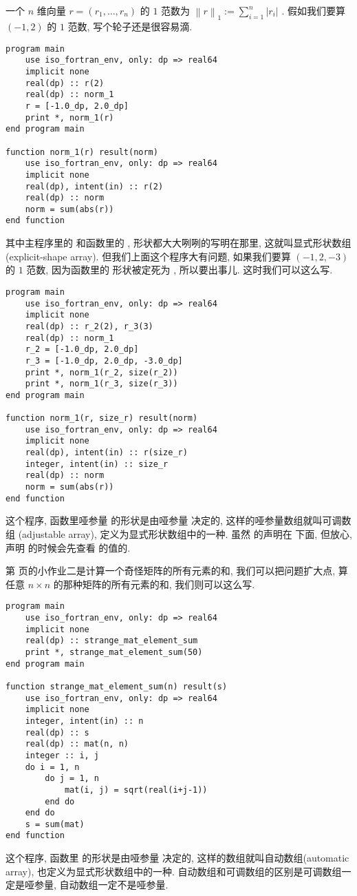一个 $ n $ 维向量 $ r=(r_1, \dots, r_n) $ 的 $ 1 $ 范数为 $ \left\lVert r\right\rVert_1:=\sum_{i=1} ^n\left\lvert r_i\right\rvert  $ . 假如我们要算 $(-1, 2) $ 的 $ 1 $ 范数, 写个轮子还是很容易滴. 
\begin{lstlisting} 
program main
    use iso_fortran_env, only: dp => real64
    implicit none
    real(dp) :: r(2)
    real(dp) :: norm_1
    r = [-1.0_dp, 2.0_dp]
    print *, norm_1(r)
end program main

function norm_1(r) result(norm)
    use iso_fortran_env, only: dp => real64
    implicit none
    real(dp), intent(in) :: r(2)
    real(dp) :: norm
    norm = sum(abs(r))
end function
\end{lstlisting} 
其中主程序里的  和函数里的 , 形状都大大咧咧的写明在那里, 这就叫显式形状数组 (explicit-shape array). 但我们上面这个程序大有问题, 如果我们要算 $(-1, 2, -3) $ 的 $ 1 $ 范数, 因为函数里的  形状被定死为 \ttt{[2]}, 所以要出事儿. 这时我们可以这么写. \label{adjustable_array} 
\begin{lstlisting} 
program main
    use iso_fortran_env, only: dp => real64
    implicit none
    real(dp) :: r_2(2), r_3(3)
    real(dp) :: norm_1
    r_2 = [-1.0_dp, 2.0_dp]
    r_3 = [-1.0_dp, 2.0_dp, -3.0_dp]
    print *, norm_1(r_2, size(r_2))
    print *, norm_1(r_3, size(r_3))
end program main

function norm_1(r, size_r) result(norm)
    use iso_fortran_env, only: dp => real64
    implicit none
    real(dp), intent(in) :: r(size_r)
    integer, intent(in) :: size_r
    real(dp) :: norm
    norm = sum(abs(r))
end function
\end{lstlisting} 
这个程序, 函数里哑参量  的形状是由哑参量  决定的, 这样的哑参量数组就叫可调数组 (adjustable array), 定义为显式形状数组中的一种. 虽然  的声明在  下面, 但放心, 声明  的时候会先查看  的值的. 

第 \pageref{hw_2} 页的小作业二是计算一个奇怪矩阵的所有元素的和, 我们可以把问题扩大点, 算任意 $ n\times n $ 的那种矩阵的所有元素的和, 我们则可以这么写. 
\begin{lstlisting} 
program main
    use iso_fortran_env, only: dp => real64
    implicit none
    real(dp) :: strange_mat_element_sum
    print *, strange_mat_element_sum(50)
end program main

function strange_mat_element_sum(n) result(s)
    use iso_fortran_env, only: dp => real64
    implicit none
    integer, intent(in) :: n
    real(dp) :: s
    real(dp) :: mat(n, n)
    integer :: i, j
    do i = 1, n
        do j = 1, n
            mat(i, j) = sqrt(real(i+j-1))
        end do
    end do
    s = sum(mat)
end function
\end{lstlisting} 
这个程序, 函数里  的形状是由哑参量  决定的, 这样的数组就叫自动数组(automatic array), 也定义为显式形状数组中的一种. 自动数组和可调数组的区别是可调数组一定是哑参量, 自动数组一定不是哑参量. 

